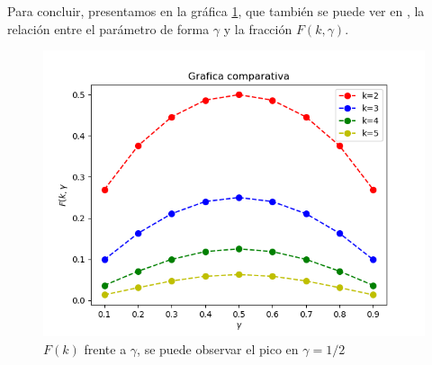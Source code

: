 \documentclass[1p]{elsarticle}
\begin{document}
    Para concluir, presentamos en la gráfica \ref{h}, que también se puede ver en \cite{arti}, la relación entre el parámetro de forma $\gamma$ y la fracción $F(k,\gamma)$.

\begin{figure}
	\centering
	\includegraphics[width=12cm]{graf_1.png}
	\caption{$F(k)$ frente a $\gamma$, se puede observar el pico en $\gamma=1/2$}
	\label{h}
\end{figure}
\end{document}
